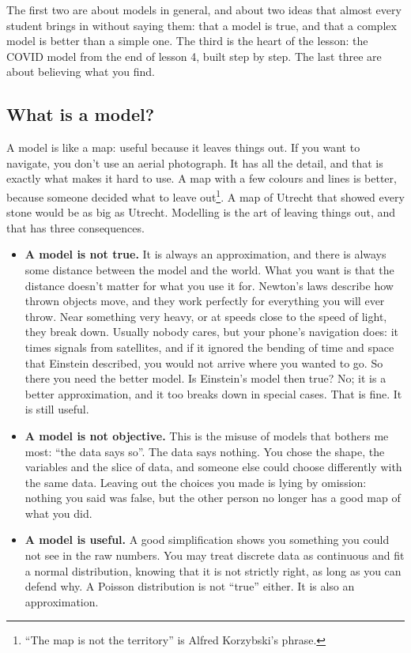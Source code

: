 \documentclass[12pt, a4paper]{article}
\theoremstyle{definition}
\theoremstyle{remark}
\begin{document}
The first two are about models in general, and about two ideas that almost every student brings in without saying them: that a model is true, and that a complex model is better than a simple one. The third is the heart of the lesson: the COVID model from the end of lesson 4, built step by step. The last three are about believing what you find.

\subsection{What is a model?}
\label{sec:what-is-a-model}
A model is like a map: useful because it leaves things out. If you want to navigate, you don't use an aerial photograph. It has all the detail, and that is exactly what makes it hard to use. A map with a few colours and lines is better, because someone decided what to leave out\footnote{``The map is not the territory'' is Alfred Korzybski's phrase.}. A map of Utrecht that showed every stone would be as big as Utrecht. Modelling is the art of leaving things out, and that has three consequences.

\begin{itemize}
\item \textbf{A model is not true.} It is always an approximation, and there is always some distance between the model and the world. What you want is that the distance doesn't matter for what you use it for. Newton's laws describe how thrown objects move, and they work perfectly for everything you will ever throw. Near something very heavy, or at speeds close to the speed of light, they break down. Usually nobody cares, but your phone's navigation does: it times signals from satellites, and if it ignored the bending of time and space that Einstein described, you would not arrive where you wanted to go. So there you need the better model. Is Einstein's model then true? No; it is a better approximation, and it too breaks down in special cases. That is fine. It is still useful.
\item \textbf{A model is not objective.} This is the misuse of models that bothers me most: ``the data says so''. The data says nothing. You chose the shape, the variables and the slice of data, and someone else could choose differently with the same data. Leaving out the choices you made is lying by omission: nothing you said was false, but the other person no longer has a good map of what you did.
\item \textbf{A model is useful.} A good simplification shows you something you could not see in the raw numbers. You may treat discrete data as continuous and fit a normal distribution, knowing that it is not strictly right, as long as you can defend why. A Poisson distribution is not ``true'' either. It is also an approximation.
\end{itemize}
\end{document}
